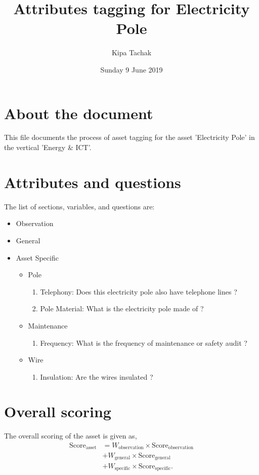 \documentclass[oneside,twocolumn]{article}
\title{Attributes tagging for Electricity Pole}
\author{Kipa Tachak}
\date{Sunday  9 June 2019}
\newcommand{\tsub}[2]{\text{#1}_{\text{#2}}}
\newcommand{\tsubb}[2]{#1_{\text{#2}}}
\begin{document}
\maketitle

\section{About the document}
This file documents the process of asset tagging for the asset 'Electricity Pole' in the
vertical 'Energy \& ICT'.

\section{Attributes and questions}
The list of sections, variables, and questions are:
    \begin{itemize}
    \item Observation
    \item General
    \item Asset Specific
    \begin{itemize}
\item Pole
\begin{enumerate}
\item Telephony: Does this electricity pole also have telephone lines ?
\item Pole Material: What is the electricity pole made of ?
\end{enumerate}

\item Maintenance
\begin{enumerate}
\item Frequency: What is the frequency of  maintenance or safety audit ?
\end{enumerate}

\item Wire
\begin{enumerate}
\item Insulation: Are the wires insulated ?
\end{enumerate}

\end{itemize}

    \end{itemize}
\section{Overall scoring}
The overall scoring of the asset is given as,
\begin{align*}
	\tsub{Score}{asset} &= \tsubb{W}{observation} \times \tsub{Score}{observation} \\
	&+ \tsubb{W}{general} \times \tsub{Score}{general} \\
	&+ \tsubb{W}{specific} \times \tsub{Score}{specific}.
\end{align*}
\end{document}
